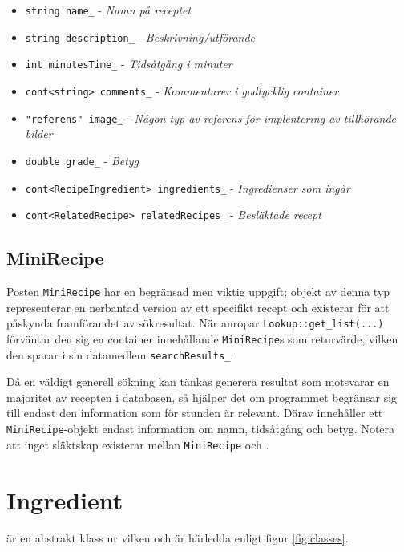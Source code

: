   \begin{itemize}
    \item \verb+string name_+ - \emph{Namn på receptet}
    \item \verb+string description_+ - \emph{Beskrivning/utförande}
    \item \verb+int minutesTime_+ - \emph{Tidsåtgång i minuter}
    \item \verb+cont<string> comments_+ - \emph{Kommentarer i godtycklig container}
    \item \verb+"referens" image_+ - \emph{Någon typ av referens för implentering av tillhörande bilder}
    \item \verb+double grade_+ - \emph{Betyg}
  \end{itemize}

  \begin{itemize}
    \item \verb+cont<RecipeIngredient> ingredients_+ - \emph{Ingredienser som ingår}
    \item \verb+cont<RelatedRecipe> relatedRecipes_+ - \emph{Besläktade recept}
  \end{itemize}

\subsection{MiniRecipe}
Posten \verb+MiniRecipe+ har en begränsad men viktig uppgift; objekt av denna typ representerar en nerbantad version av ett specifikt recept och existerar för att påskynda framförandet av sökresultat. När \Shell{} anropar \verb+Lookup::get_list(...)+ förväntar den sig en container innehållande \verb+MiniRecipe+s som returvärde, vilken den sparar i sin datamedlem \verb+searchResults_+.

Då en väldigt generell sökning kan tänkas generera resultat som motsvarar en majoritet av recepten i databasen, så hjälper det om programmet begränsar sig till endast den information som för stunden är relevant. Därav innehåller ett \verb+MiniRecipe+-objekt endast information om namn, tidsåtgång och betyg. Notera att inget släktskap existerar mellan \verb+MiniRecipe+ och \Recipe.

\section{Ingredient}
\Ingredient{} är en abstrakt klass ur vilken \InfoIngredient{} och \RecipeIngredient{} är härledda enligt figur \ref{fig:classes}.

